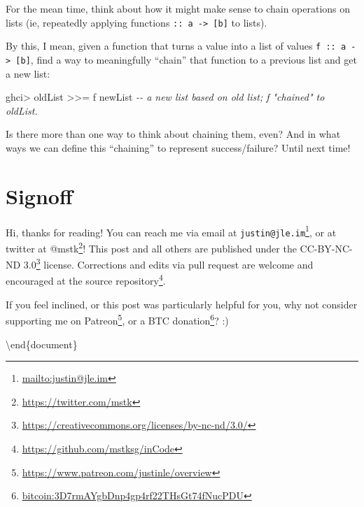 \documentclass[]{article}
\newenvironment{Shaded}{}{}
\newcommand{\CommentTok}[1]{\textcolor[rgb]{0.38,0.63,0.69}{\textit{#1}}}
\newcommand{\NormalTok}[1]{#1}
\newcommand{\OperatorTok}[1]{\textcolor[rgb]{0.40,0.40,0.40}{#1}}
\renewcommand{\href}[2]{#2\footnote{\url{#1}}}
\begin{document}
For the mean time, think about how it might make sense to chain operations on
lists (ie, repeatedly applying functions
\texttt{::\ a\ -\textgreater{}\ {[}b{]}} to lists).

By this, I mean, given a function that turns a value into a list of values
\texttt{f\ ::\ a\ -\textgreater{}\ {[}b{]}}, find a way to meaningfully
``chain'' that function to a previous list and get a new list:

\begin{Shaded}
\begin{Highlighting}[]
\NormalTok{ghci}\OperatorTok{\textgreater{}}\NormalTok{ oldList }\OperatorTok{\textgreater{}\textgreater{}=}\NormalTok{ f}
\NormalTok{newList             }\CommentTok{{-}{-} a new list based on old list; f "chained" to \textasciigrave{}oldList\textasciigrave{}.}
\end{Highlighting}
\end{Shaded}

Is there more than one way to think about chaining them, even? And in what ways
we can define this ``chaining'' to represent success/failure? Until next time!

\section{Signoff}\label{signoff}

Hi, thanks for reading! You can reach me via email at
\href{mailto:justin@jle.im}{\nolinkurl{justin@jle.im}}, or at twitter at
\href{https://twitter.com/mstk}{@mstk}! This post and all others are published
under the \href{https://creativecommons.org/licenses/by-nc-nd/3.0/}{CC-BY-NC-ND
3.0} license. Corrections and edits via pull request are welcome and encouraged
at \href{https://github.com/mstksg/inCode}{the source repository}.

If you feel inclined, or this post was particularly helpful for you, why not
consider \href{https://www.patreon.com/justinle/overview}{supporting me on
Patreon}, or a \href{bitcoin:3D7rmAYgbDnp4gp4rf22THsGt74fNucPDU}{BTC donation}?
:)

\textbackslash end\{document\}
\end{document}
